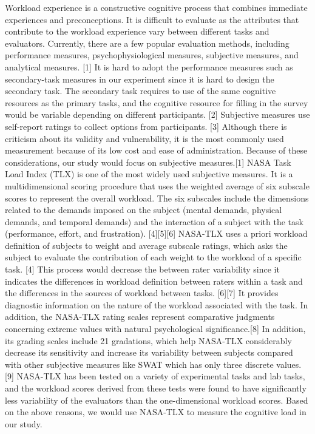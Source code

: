 Workload experience is a constructive cognitive process that combines immediate experiences and preconceptions. 
It is difficult to evaluate as the attributes that contribute to the workload experience vary between different tasks and evaluators. Currently, there are a few popular evaluation methods, including performance measures, psychophysiological measures, subjective measures, and analytical measures. [1] It is hard to adopt the performance measures such as secondary-task measures in our experiment since it is hard to design the secondary task. The secondary task requires to use of the same cognitive resources as the primary tasks, and the cognitive resource for filling in the survey would be variable depending on different participants. [2] Subjective measures use self-report ratings to collect options from participants. [3] Although there is criticism about its validity and vulnerability, it is the most commonly used measurement because of its low cost and ease of administration.  Because of these considerations, our study would focus on subjective measures.[1] NASA Task Load Index (TLX) is one of the most widely used subjective measures. It is a multidimensional scoring procedure that uses the weighted average of six subscale scores to represent the overall workload. The six subscales include the dimensions related to the demands imposed on the subject (mental demands, physical demands, and temporal demands) and the interaction of a subject with the task (performance, effort, and frustration). [4][5][6] NASA-TLX uses a priori workload definition of subjects to weight and average subscale ratings, which asks the subject to evaluate the contribution of each weight to the workload of a specific task. [4] This process would decrease the between rater variability since it indicates the differences in workload definition between raters within a task and the differences in the sources of workload between tasks. [6][7] It provides diagnostic information on the nature of the workload associated with the task. In addition, the NASA-TLX rating scales represent comparative judgments concerning extreme values with natural psychological significance.[8] In addition, its grading scales include 21 gradations, which help NASA-TLX considerably decrease its sensitivity and increase its variability between subjects compared with other subjective measures like SWAT which has only three discrete values. [9] NASA-TLX has been tested on a variety of experimental tasks and lab tasks, and the workload scores derived from these tests were found to have significantly less variability of the evaluators than the one-dimensional workload scores. Based on the above reasons, we would use NASA-TLX to measure the cognitive load in our study.
